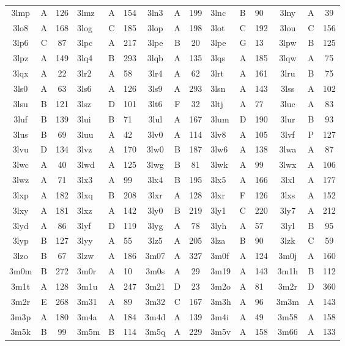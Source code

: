 \begin{longtable}{|c|c|c| a|a|a| c|c|c| a|a|a| c|c|c|}
3lmp & A & 126 & 3lmz & A & 154 & 3ln3 & A & 199 & 3lnc & B & 90 & 3lny & A & 39\\
3lo8 & A & 168 & 3log & C & 185 & 3lop & A & 198 & 3lot & C & 192 & 3lou & C & 156\\
3lp6 & C & 87 & 3lpc & A & 217 & 3lpe & B & 20 & 3lpe & G & 13 & 3lpw & B & 125\\
3lpz & A & 149 & 3lq4 & B & 293 & 3lqb & A & 135 & 3lqs & A & 185 & 3lqw & A & 75\\
3lqx & A & 22 & 3lr2 & A & 58 & 3lr4 & A & 62 & 3lrt & A & 161 & 3lru & B & 75\\
3ls0 & A & 63 & 3ls6 & A & 126 & 3ls9 & A & 293 & 3lsn & A & 143 & 3lss & A & 102\\
3lsu & B & 121 & 3lsz & D & 101 & 3lt6 & F & 32 & 3ltj & A & 77 & 3luc & A & 83\\
3luf & B & 139 & 3lui & B & 71 & 3lul & A & 167 & 3lum & D & 190 & 3lur & B & 93\\
3lus & B & 69 & 3luu & A & 42 & 3lv0 & A & 114 & 3lv8 & A & 105 & 3lvf & P & 127\\
3lvu & D & 134 & 3lvz & A & 170 & 3lw0 & B & 187 & 3lw6 & A & 138 & 3lwa & A & 87\\
3lwc & A & 40 & 3lwd & A & 125 & 3lwg & B & 81 & 3lwk & A & 99 & 3lwx & A & 106\\
3lwz & A & 71 & 3lx3 & A & 99 & 3lx4 & B & 195 & 3lx5 & A & 166 & 3lxl & A & 177\\
3lxp & A & 182 & 3lxq & B & 208 & 3lxr & A & 128 & 3lxr & F & 126 & 3lxs & A & 152\\
3lxy & A & 181 & 3lxz & A & 142 & 3ly0 & B & 219 & 3ly1 & C & 220 & 3ly7 & A & 212\\
3lyd & A & 86 & 3lyf & D & 119 & 3lyg & A & 78 & 3lyh & A & 57 & 3lyl & B & 95\\
3lyp & B & 127 & 3lyy & A & 55 & 3lz5 & A & 205 & 3lza & B & 90 & 3lzk & C & 59\\
3lzo & B & 67 & 3lzw & A & 186 & 3m07 & A & 327 & 3m0f & A & 124 & 3m0j & A & 160\\
3m0m & B & 272 & 3m0r & A & 10 & 3m0s & A & 29 & 3m19 & A & 143 & 3m1h & B & 112\\
3m1t & A & 128 & 3m1u & A & 247 & 3m21 & D & 23 & 3m2o & A & 81 & 3m2r & D & 360\\
3m2r & E & 268 & 3m31 & A & 89 & 3m32 & C & 167 & 3m3h & A & 96 & 3m3m & A & 143\\
3m3p & A & 180 & 3m4a & A & 184 & 3m4d & A & 139 & 3m4i & A & 49 & 3m58 & A & 158\\
3m5k & B & 99 & 3m5m & B & 114 & 3m5q & A & 229 & 3m5v & A & 158 & 3m66 & A & 133\\

\end{longtable}
